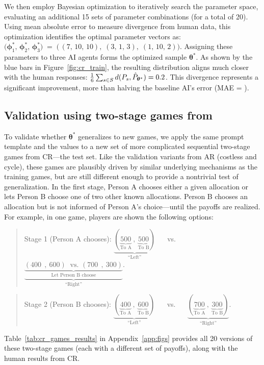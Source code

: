 \documentclass[11pt]{article}
\theoremstyle{definition}
\newcommand{\aisub}{AI agent}
\begin{document}
We then employ Bayesian optimization to iteratively search the parameter space, evaluating an additional 15 sets of parameter combinations (for a total of 20). 
Using mean absolute error to measure divergence from human data, this optimization identifies the optimal parameter vectors as:
$\bigl(\bm{\phi}_1^*,\,\bm{\phi}_2^*,\,\bm{\phi}_3^*\bigr) \;=\; \bigl(\,(7,\,10,\,10),\;(3,\,1,\,3),\;(1,\,10,\,2)\bigr)$.
Assigning these parameters to three \aisub{s} forms the optimized sample $\bm{\theta}^*$. 
As shown by the blue bars in Figure~\ref{fig:cr_train}, the resulting distribution aligns much closer with the human responses: $\frac{1}{6}\sum_{s \in S} d(P_s,\hat P_{\bm{\theta}^*})=0.2$.
This divergence represents a significant improvement, more than halving the baseline AI's error (MAE = \CRBaselineTrainMAE).

\subsection{Validation using two-stage games from \cite{charness2002understanding}}
\label{sec:validate_prompt}

To validate whether $\bm{\theta}^*$ generalizes to new games, we apply the same prompt template and the values to a new set of more complicated sequential two-stage games from CR---the test set.
Like the validation variants from AR (costless and cycle), these games are plausibly driven by similar underlying mechanisms as the training games, but are still different enough to provide a nontrivial test of generalization.
In the first stage, Person A chooses either a given allocation or lets Person B choose one of two other known allocations.
Person B chooses an allocation but is not informed of Person A's choice---until the payoffs are realized.
For example, in one game, players are shown the following options:
\begin{quote}
Stage 1 (Person A chooses): $\underbrace{(\underbrace{500}_{\mbox{To A}}\:, \:\underbrace{500}_{\mbox{To B}})}_{\mbox{``Left''}}$ $\quad$ vs. $\quad$  $\underbrace{\underbrace{(400\:\:,\:600)\:\text{    vs.  }(700\:\:,\: 300)}_{\mbox{Let Person B choose}}}_{\mbox{``Right''}}$.
\end{quote}
\begin{quote}
Stage 2  (Person B chooses): $\underbrace{(\underbrace{400}_{\mbox{To A}}\:,\: \underbrace{600}_{\mbox{To B}})}_{\mbox{``Left''}}$ $\quad$ vs. $\quad$ $\underbrace{(\underbrace{700}_{\mbox{To A}}\:,\: \underbrace{300}_{\mbox{To B}})}_{\mbox{``Right''}}$.
\end{quote}
Table~\ref{tab:cr_games_results} in Appendix~\ref{app:figs} provides all 20 versions of these two-stage games (each with a different set of payoffs), along with the human results from CR.
\end{document}
